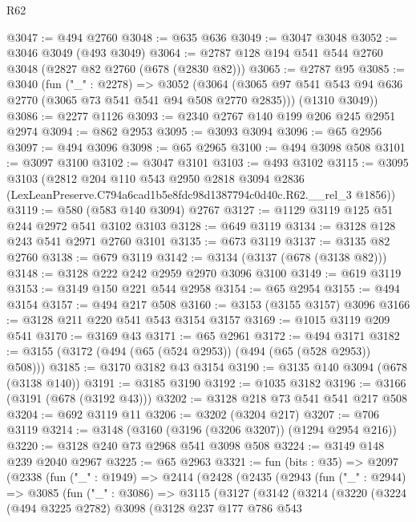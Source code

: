 \begin{lexlean}{R62}
\begin{coremodule}
@3047 := @494 @2760
@3048 := @635 @636
@3049 := @3047 @3048
@3052 := @3046 @3049 (@493 @3049)
@3064 := @2787 @128 @194 @541 @544 @2760 @3048 (@2827 @82 @2760 (@678 (@2830 @82)))
@3065 := @2787 @95
@3085 := @3040
    (fun ("_" : @2278) =>
    @3052
      (@3064 (@3065 @97 @541 @543 @94 @636 @2770 (@3065 @73 @541 @541 @94 @508 @2770 @2835)))
      (@1310 @3049))
@3086 := @2277 @1126
@3093 := @2340 @2767 @140 @199 @206 @245 @2951 @2974
@3094 := @862 @2953
@3095 := @3093 @3094
@3096 := @65 @2956
@3097 := @494 @3096
@3098 := @65 @2965
@3100 := @494 @3098 @508
@3101 := @3097 @3100
@3102 := @3047 @3101
@3103 := @493 @3102
@3115 := @3095
    @3103
    (@2812
      @204
      @110
      @543
      @2950
      @2818
      @3094
      @2836
      (LexLeanPreserve.C794a6cad1b5e8fdc98d1387794c0d40c.R62.__rel_3 @1856))
@3119 := @580 (@583 @140 @3094) @2767
@3127 := @1129 @3119 @125 @51 @244 @2972 @541 @3102 @3103
@3128 := @649 @3119
@3134 := @3128 @128 @243 @541 @2971 @2760 @3101
@3135 := @673 @3119
@3137 := @3135 @82 @2760
@3138 := @679 @3119
@3142 := @3134 (@3137 (@678 (@3138 @82)))
@3148 := @3128 @222 @242 @2959 @2970 @3096 @3100
@3149 := @619 @3119
@3153 := @3149 @150 @221 @544 @2958
@3154 := @65 @2954
@3155 := @494 @3154
@3157 := @494 @217 @508
@3160 := @3153 (@3155 @3157) @3096
@3166 := @3128 @211 @220 @541 @543 @3154 @3157
@3169 := @1015 @3119 @209 @541
@3170 := @3169 @43
@3171 := @65 @2961
@3172 := @494 @3171
@3182 := @3155 (@3172 (@494 (@65 (@524 @2953)) (@494 (@65 (@528 @2953)) @508)))
@3185 := @3170 @3182 @43 @3154
@3190 := @3135 @140 @3094 (@678 (@3138 @140))
@3191 := @3185 @3190
@3192 := @1035 @3182
@3196 := @3166 (@3191 (@678 (@3192 @43)))
@3202 := @3128 @218 @73 @541 @541 @217 @508
@3204 := @692 @3119 @11
@3206 := @3202 (@3204 @217)
@3207 := @706 @3119
@3214 := @3148 (@3160 (@3196 (@3206 @3207)) (@1294 @2954 @216))
@3220 := @3128 @240 @73 @2968 @541 @3098 @508
@3224 := @3149 @148 @239 @2040 @2967
@3225 := @65 @2963
@3321 := fun (bits : @35) =>
  @2097
    (@2338
      (fun ("_" : @1949) =>
      @2414
        (@2428
          (@2435
            (@2943
              (fun ("_" : @2944) =>
              @3085
                (fun ("_" : @3086) =>
                @3115
                  (@3127
                    (@3142
                      (@3214
                        (@3220
                          (@3224
                            (@494 @3225 @2782)
                            @3098
                            (@3128
                              @237
                              @177
                              @786
                              @543

\end{coremodule}
\end{lexlean}
